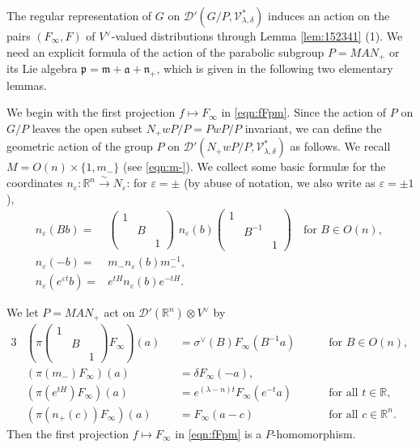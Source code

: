 The regular representation of $G$
 on ${\mathcal{D}}'(G/P, {\mathcal{V}}_{\lambda, \delta}^{\ast})$ induces
 an action
 on the pairs $(F_{\infty}, F)$
 of $V^{\vee}$-valued distributions
 through Lemma \ref{lem:152341} (1).  
We need an explicit formula
 of the action of the parabolic subgroup $P=MAN_+$
 or its Lie algebra
$
  {\mathfrak{p}}
 ={\mathfrak{m}}
 +{\mathfrak{a}}
 +{\mathfrak{n}}_+
$, 
 which is given in the following two elementary lemmas.  



We begin with the first projection $f \mapsto F_{\infty}$ in \eqref{eqn:fFpm}.  
Since the action of $P$ on $G/P$ leaves the open subset 
 $N_+ w P /P = P w P /P$ invariant, 
 we can define the geometric action
 of the group $P$ on ${\mathcal{D}}'(N_+ w P /P, {\mathcal{V}}_{\lambda,\delta}^{\ast})$
 as follows.  
We recall 
$
M=O(n) \times \{1, m_-\}
$
 (see \eqref{eqn:m-}).  
We collect
 some basic formul{\ae} for the coordinates 
 $n_{\varepsilon}\colon {\mathbb{R}}^n \overset \sim \to N_{\varepsilon}$:
 for $\varepsilon = \pm$
 (by abuse of notation, 
 we also write as $\varepsilon = \pm 1$), 
\begin{align}
{n_{\varepsilon}} (Bb)
   =& \begin{pmatrix} 1 \\ & B \\ && 1 \end{pmatrix}
\,\,
n_{\varepsilon} (b)
      \begin{pmatrix} 1 \\ & B^{-1} \\ && 1 \end{pmatrix}
\quad
\text{for $B \in O(n)$, }
\label{eqn:nAb}
\\
 {n_{\varepsilon}} (-b)
   =& m_- {n_{\varepsilon}} (b) m_-^{-1},
\label{eqn:minvn}
\\
 {n_{\varepsilon}} (e^{{\varepsilon}t} b)
   =& e^{tH} {n_{\varepsilon}} (b) e^{-tH}.  
\label{eqn:invm}
\end{align}
\begin{lemma}
\label{lem:152343}
We let $P=M A N_+$ act on 
$
   {\mathcal{D}}'({\mathbb{R}}^n) \otimes V^{\vee}
$
by
\begin{alignat}{3}
&\left(\pi \begin{pmatrix} 1 & & \\ & B & \\ & & 1 \end{pmatrix} F_{\infty}\right)(a)
&&=\sigma^{\vee}(B) F_{\infty}(B^{-1}a)
\quad
&&\text{ for $B \in O(n)$, }
\label{eqn:inftyM}
\\
&(\pi (m_-) F_{\infty})(a)
&&=\delta F_{\infty}(-a), 
&&
\label{eqn:inftym}
\\
&(\pi (e^{tH}) F_{\infty})(a)
&&= e^{(\lambda-n)t} F_{\infty}(e^{-t}a)
\quad
&&\text{ for all $t \in {\mathbb{R}}$, }
\label{eqn:inftyA}
\\
&(\pi (n_+(c)) F_{\infty})(a)
&&= F_{\infty}(a-c)
\quad
&&\text{ for all $c \in {\mathbb{R}}^{n}$. }
\label{eqn:inftyN}
\end{alignat}
Then the first projection $f \mapsto F_{\infty}$ in \eqref{eqn:fFpm}
 is a $P$-homomorphism.  
\end{lemma}
